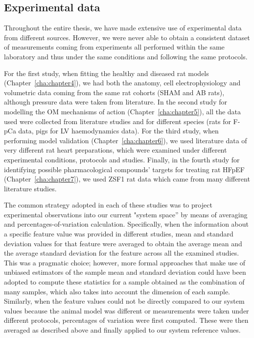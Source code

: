 %
%
%
\subsection{Experimental data}\label{sec:ch9experimental_data}
Throughout the entire thesis, we have made extensive use of experimental data from different sources. However, we were never able to obtain a consistent dataset of measurements coming from experiments all performed within the same laboratory and thus under the same conditions and following the same protocols.

\vspace{0.2cm}
For the first study, when fitting the healthy and diseased rat models (Chapter~\ref{cha:chapter4}), we had both the anatomy, cell electrophysiology and volumetric data coming from the same rat cohorts (SHAM and AB rats), although pressure data were taken from literature. In the second study for modelling the OM mechanisms of action (Chapter~\ref{cha:chapter5}), all the data used were collected from literature studies and for different species (rats for F-pCa data, pigs for LV haemodynamics data). For the third study, when performing model validation (Chapter~\ref{cha:chapter6}), we used literature data of very different rat heart preparations, which were examined under different experimental conditions, protocols and studies. Finally, in the fourth study for identifying possible pharmacological compounds' targets for treating rat HFpEF (Chapter~\ref{cha:chapter7}), we used ZSF1 rat data which came from many different literature studies.

\vspace{0.2cm}
The common strategy adopted in each of these studies was to project experimental observations into our current "system space'' by means of averaging and percentages-of-variation calculation. Specifically, when the information about a specific feature value was provided in different studies, mean and standard deviation values for that feature were averaged to obtain the average mean and the average standard deviation for the feature across all the examined studies. This was a pragmatic choice; however, more formal approaches that make use of unbiased estimators of the sample mean and standard deviation could have been adopted to compute these statistics for a sample obtained as the combination of many samples, which also takes into account the dimension of each sample. Similarly, when the feature values could not be directly compared to our system values because the animal model was different or measurements were taken under different protocols, percentages of variation were first computed. These were then averaged as described above and finally applied to our system reference values.


